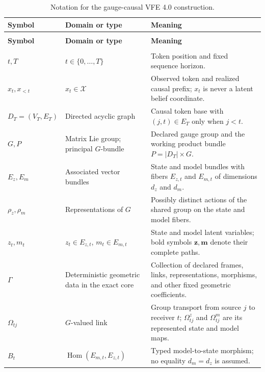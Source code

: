 {\small
\begin{longtable}{>{\raggedright\arraybackslash}p{} >{\raggedright\arraybackslash}p{} >{\raggedright\arraybackslash}p{}}
\caption{Notation for the gauge-causal VFE 4.0 construction.}
\label{tab:vfe4-notation}\\
\toprule
\textbf{Symbol} & \textbf{Domain or type} & \textbf{Meaning} \\
\midrule
\endfirsthead
\multicolumn{3}{c}{\tablename\ \thetable\ continued}\\
\toprule
\textbf{Symbol} & \textbf{Domain or type} & \textbf{Meaning} \\
\midrule
\endhead
\midrule
\multicolumn{3}{r}{Continued on the next page}\\
\endfoot
\bottomrule
\endlastfoot
$t,T$ & $t\in\{0,\ldots,T\}$ & Token position and fixed sequence horizon. \\
\addlinespace
$x_t,x_{<t}$ & $x_t\in\mathcal X$ & Observed token and realized causal prefix; $x_t$ is never a latent belief coordinate. \\
\addlinespace
$D_T=(V_T,E_T)$ & Directed acyclic graph & Causal token base with $(j,t)\in E_T$ only when $j<t$. \\
\addlinespace
$G,P$ & Matrix Lie group; principal $G$-bundle & Declared gauge group and the working product bundle $P=|D_T|\times G$. \\
\addlinespace
$E_z,E_m$ & Associated vector bundles & State and model bundles with fibers $E_{z,t}$ and $E_{m,t}$ of dimensions $d_z$ and $d_m$. \\
\addlinespace
$\rho_z,\rho_m$ & Representations of $G$ & Possibly distinct actions of the shared group on the state and model fibers. \\
\addlinespace
$z_t,m_t$ & $z_t\in E_{z,t}$, $m_t\in E_{m,t}$ & State and model latent variables; bold symbols $\boldsymbol z,\boldsymbol m$ denote their complete paths. \\
\addlinespace
$\Gamma$ & Deterministic geometric data in the exact core & Collection of declared frames, links, representations, morphisms, and other fixed geometric coefficients. \\
\addlinespace
$\Omega_{tj}$ & $G$-valued link & Group transport from source $j$ to receiver $t$; $\Omega^z_{tj}$ and $\Omega^m_{tj}$ are its represented state and model maps. \\
\addlinespace
$B_t$ & $\operatorname{Hom}(E_{m,t},E_{z,t})$ & Typed model-to-state morphism; no equality $d_m=d_z$ is assumed. \\

\end{longtable}}
